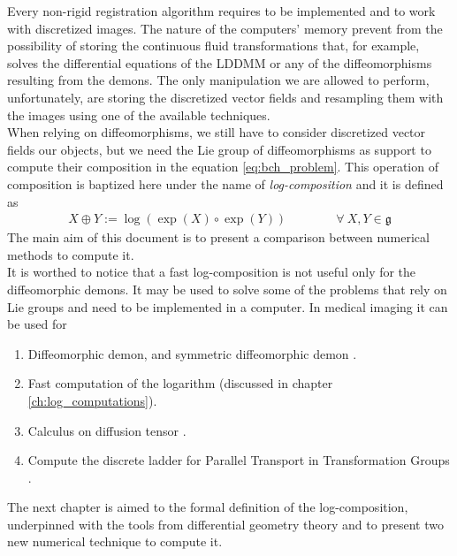 Every non-rigid registration algorithm requires to be implemented and to work with discretized images.
The nature of the computers' memory prevent from the possibility of storing the continuous fluid transformations that, for example, solves the differential equations of the LDDMM or any of the diffeomorphisms resulting from the demons. The only manipulation we are allowed to perform, unfortunately, are storing the discretized vector fields and resampling them with the images using one of the available techniques.\\
When relying on diffeomorphisms, we still have to consider discretized vector fields our objects, but we need the Lie group of diffeomorphisms as support to compute their composition in the equation \ref{eq:bch_problem}.
This operation of composition is baptized here under the name of \emph{log-composition} and it is defined as
\begin{align*}
X \oplus Y := \log(\exp(X)\circ\exp( Y))
\qquad \qquad
\forall ~X, Y \in \mathfrak{g}
\end{align*}
The main aim of this document is to present a comparison between numerical methods to compute it. \\

It is worthed to notice that a fast log-composition is not useful only for the diffeomorphic demons. It may be used to solve some of the problems that rely on Lie groups and need to be implemented in a computer. In medical imaging it can be used for
\begin{enumerate}
	\item Diffeomorphic demon, and symmetric diffeomorphic demon \cite{vercauteren2006robust, vercauteren08}.
	\item Fast computation of the logarithm \cite{Bossa:08} (discussed in chapter \ref{ch:log_computations}).
	\item Calculus on diffusion tensor \cite{Arsigny:MRM:06}. 
	\item Compute the discrete ladder for Parallel Transport in Transformation Groups \cite{Lorenzi:discrete_ladders:14}.
\end{enumerate}	
	
The next chapter is aimed to the formal definition of the log-composition, underpinned with the tools from differential geometry theory and to present two new numerical technique to compute it.







